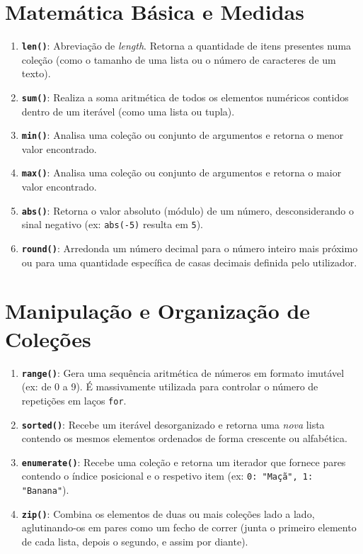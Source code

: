 \documentclass[11pt,a4paper]{article}
\begin{document}
\section{Matemática Básica e Medidas}
\begin{enumerate}[label=\arabic*., leftmargin=*, resume]
    \item \textbf{\texttt{len()}}: Abreviação de \textit{length}. Retorna a quantidade de itens presentes numa coleção (como o tamanho de uma lista ou o número de caracteres de um texto).
    \item \textbf{\texttt{sum()}}: Realiza a soma aritmética de todos os elementos numéricos contidos dentro de um iterável (como uma lista ou tupla).
    \item \textbf{\texttt{min()}}: Analisa uma coleção ou conjunto de argumentos e retorna o menor valor encontrado.
    \item \textbf{\texttt{max()}}: Analisa uma coleção ou conjunto de argumentos e retorna o maior valor encontrado.
    \item \textbf{\texttt{abs()}}: Retorna o valor absoluto (módulo) de um número, desconsiderando o sinal negativo (ex: \texttt{abs(-5)} resulta em \texttt{5}).
    \item \textbf{\texttt{round()}}: Arredonda um número decimal para o número inteiro mais próximo ou para uma quantidade específica de casas decimais definida pelo utilizador.
\end{enumerate}

\section{Manipulação e Organização de Coleções}
\begin{enumerate}[label=\arabic*., leftmargin=*, resume]
    \item \textbf{\texttt{range()}}: Gera uma sequência aritmética de números em formato imutável (ex: de 0 a 9). É massivamente utilizada para controlar o número de repetições em laços \texttt{for}.
    \item \textbf{\texttt{sorted()}}: Recebe um iterável desorganizado e retorna uma \textit{nova} lista contendo os mesmos elementos ordenados de forma crescente ou alfabética.
    \item \textbf{\texttt{enumerate()}}: Recebe uma coleção e retorna um iterador que fornece pares contendo o índice posicional e o respetivo item (ex: \texttt{0: "Maçã", 1: "Banana"}).
    \item \textbf{\texttt{zip()}}: Combina os elementos de duas ou mais coleções lado a lado, aglutinando-os em pares como um fecho de correr (junta o primeiro elemento de cada lista, depois o segundo, e assim por diante).
\end{enumerate}
\end{document}
